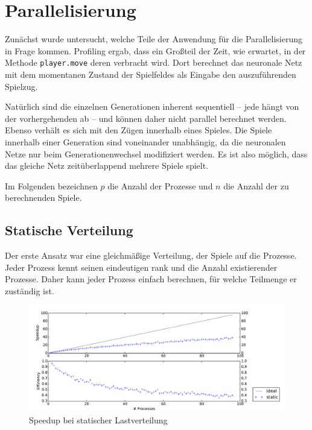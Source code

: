 \section{Parallelisierung}

Zunächst wurde untersucht, welche Teile der Anwendung für die Parallelisierung
in Frage kommen. Profiling ergab, dass ein Großteil der Zeit, wie erwartet, in
der Methode \texttt{player.move} deren verbracht wird. Dort berechnet das
neuronale Netz mit dem momentanen Zustand der Spielfeldes als Eingabe den
auszuführenden Spielzug.

Natürlich sind die einzelnen Generationen inherent sequentiell -- jede hängt von
der vorhergehenden ab -- und können daher nicht parallel berechnet werden. 
Ebenso verhält es sich mit den Zügen innerhalb eines Spieles.
Die Spiele innerhalb einer Generation sind voneinander unabhängig, da die
neuronalen Netze nur beim Generationenwechsel modifiziert werden. Es ist also
möglich, dass das gleiche Netz zeitüberlappend mehrere Spiele spielt.

Im Folgenden bezeichnen $p$ die Anzahl der Prozesse und $n$ die Anzahl der zu
berechnenden Spiele.

\subsection{Statische Verteilung}

Der erste Ansatz war eine gleichmäßige Verteilung, der Spiele auf die Prozesse.
Jeder Prozess kennt seinen eindeutigen rank und die Anzahl existierender
Prozesse.  Daher kann jeder Prozess einfach berechnen, für welche Teilmenge er
zuständig ist.

\begin{figure}
    \centering
    \includegraphics[width=\textwidth]
        {content/img/strong_scaling_time_static.pdf}
    \caption{Speedup bei statischer Lastverteilung}
    \label{fig:speedup_static}
\end{figure}

